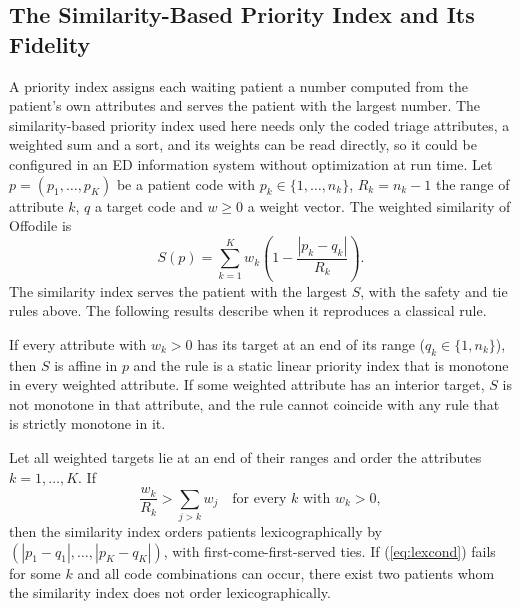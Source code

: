 \subsection{The Similarity-Based Priority Index and Its Fidelity}
\label{sec:propositions}

A priority index assigns each waiting patient a number computed from the patient's own attributes and serves the patient with the largest number. The similarity-based priority index used here needs only the coded triage attributes, a weighted sum and a sort, and its weights can be read directly, so it could be configured in an ED information system without optimization at run time. Let $p=(p_1,\dots,p_K)$ be a patient code with $p_k\in\{1,\dots,n_k\}$, $R_k=n_k-1$ the range of attribute $k$, $q$ a target code and $w\geq 0$ a weight vector. The weighted similarity of Offodile \cite{OFFODILE1990} is
\begin{equation}
S(p) = \sum_{k=1}^{K} w_k\left(1-\frac{|p_k-q_k|}{R_k}\right).
\label{eq:sim}
\end{equation}
The similarity index serves the patient with the largest $S$, with the safety and tie rules above. The following results describe when it reproduces a classical rule.

\begin{proposition}
\label{prop:linear}
If every attribute with $w_k>0$ has its target at an end of its range ($q_k\in\{1,n_k\}$), then $S$ is affine in $p$ and the rule is a static linear priority index that is monotone in every weighted attribute. If some weighted attribute has an interior target, $S$ is not monotone in that attribute, and the rule cannot coincide with any rule that is strictly monotone in it.
\end{proposition}


\begin{proposition}
\label{prop:lex}
Let all weighted targets lie at an end of their ranges and order the attributes $k=1,\dots,K$. If
\begin{equation}
\frac{w_k}{R_k} > \sum_{j>k} w_j \quad \text{for every } k \text{ with } w_k>0,
\label{eq:lexcond}
\end{equation}
then the similarity index orders patients lexicographically by $(|p_1-q_1|,\dots,|p_K-q_K|)$, with first-come-first-served ties. If (\ref{eq:lexcond}) fails for some $k$ and all code combinations can occur, there exist two patients whom the similarity index does not order lexicographically.
\end{proposition}


